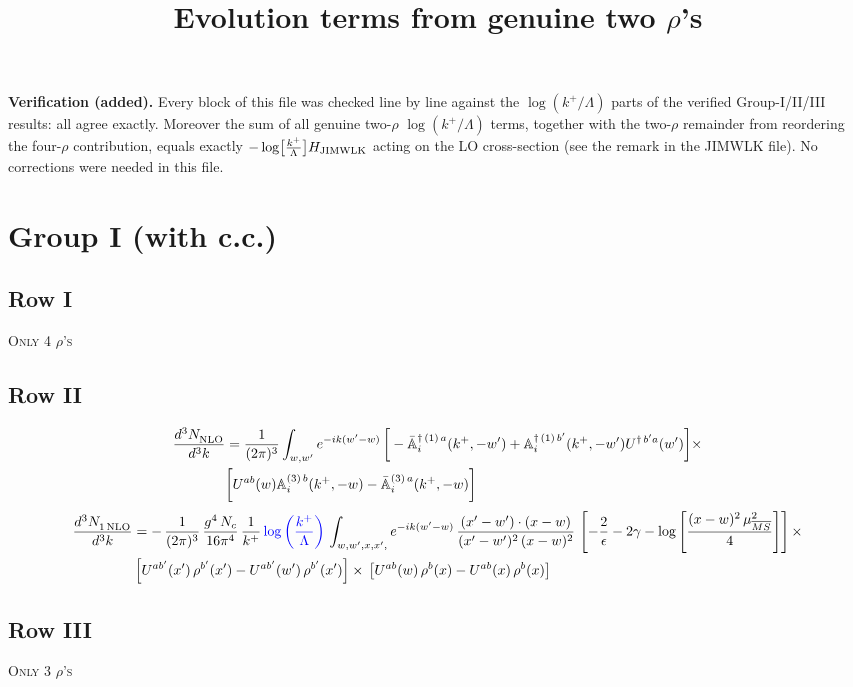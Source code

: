 \documentclass[9pt]{article}
\title{Evolution terms from genuine two $\rho$'s}
\author{}
\date{}
\def\mf#1{\mathbb{#1}}
\numberwithin{equation}{section}
\begin{document}
{\color{red}\noindent\textbf{Verification (added).} Every block of this file was checked line by line against the $\log(k^{+}/\Lambda)$ parts of the verified Group-I/II/III results: all agree exactly. Moreover the sum of all genuine two-$\rho$ $\log(k^{+}/\Lambda)$ terms, together with the two-$\rho$ remainder from reordering the four-$\rho$ contribution, equals exactly $-\log\!\big[\tfrac{k^{+}}{\Lambda}\big]H_{\rm JIMWLK}$ acting on the LO cross-section (see the remark in the JIMWLK file). No corrections were needed in this file.}
\maketitle
\section{Group I (with c.c.)}
\subsection{Row I}
\textsc{Only 4 $\rho$'s}
\subsection{Row II}
\begin{align}
    \frac{d^{3}N_{\rm NLO}^{\rm}}{d^{3}k} &  = \frac{1}{(2\pi)^{3}}  \int_{w, w^\prime} e^{-ik(w^\prime-w)}\,\bigg[-\bar{\mf{A}}^{\dagger\,(1)\,a}_{i}(k^{+},-w^{\prime})+\mf{A}^{\dagger\, (1)\, b^{\prime}}_{i}(k^{+},-w^{\prime})U^{\dagger\,b^{\prime}a}(w^{\prime})\bigg]\times \notag \\ & \bigg[U^{ab}(w)\mf{A}^{(3)\, b}_{i}(k^{+},- w)-\Bar{\mf{A}}^{(3)\, a}_{i}(k^{+}, - w)\bigg]\nonumber
\end{align}
\begin{align}
     \frac{d^{3}N_{1\,\rm NLO}^{\rm}}{d^{3}k} &  = -\,\frac{1}{(2\pi)^{3}}\, \frac{g^{4}\,N_{c}}{16\pi^{4}}\,\frac{1}{k^{+}}\,{\color{blue}\log{\left(\frac{k^{+}}{\Lambda}\right)}}\, \int_{w, w',x,x',} e^{-ik(w^\prime-w)}\, \frac{(x'-w')\cdot (x-w)}{(x'-w')^{2}\, (x-w)^{2}}\, \left[-\frac{2}{\epsilon}-2\gamma-\log{\left[\frac{(x-w)^{2}\,\mu^{2}_{\overline{MS}}}{4}\right]}\right]\times\notag \\ & \left[U^{ab'}(x')\,\rho^{b'}(x') - U^{ab'}(w')\,\rho^{b'}(x')\right]\times\,\left[U^{ab}(w)\,\rho^{b}(x) - U^{ab}(x)\,\rho^{b}(x)\right]
\end{align}
\subsection{Row III}
\textsc{Only 3 $\rho$'s}
\end{document}
